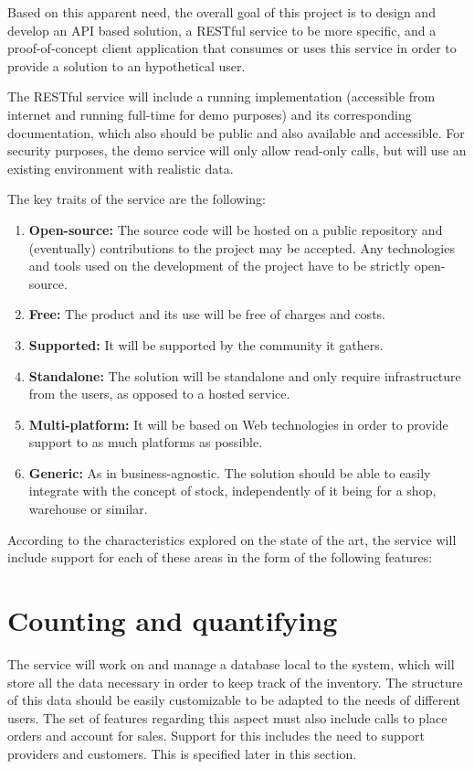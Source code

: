 Based on this apparent need, the overall goal of this project is to design and develop an API based solution, a RESTful service to be more specific, and a proof-of-concept client application that consumes or uses this service in order to provide a solution to an hypothetical user.

The RESTful service will include a running implementation (accessible from internet and running full-time for demo purposes) and its corresponding documentation, which also should be public and also available and accessible. For security purposes, the demo service will only allow read-only calls, but will use an existing environment with realistic data. 

The key traits of the service are the following:

\begin{enumerate}
\item \textbf{Open-source:}
The source code will be hosted on a public repository and (eventually) contributions to the project may be accepted. Any technologies and tools used  on the development of the project have to be strictly open-source.

\item \textbf{Free:}
The product and its use will be free of charges and costs.

\item \textbf{Supported:}
It will be supported by the community it gathers.

\item \textbf{Standalone:}
The solution will be standalone and only require infrastructure from the users, as opposed to a hosted service.

\item \textbf{Multi-platform:}
It will be based on Web technologies in order to provide support to as much platforms as possible.

\item \textbf{Generic:}
As in business-agnostic. The solution should be able to easily integrate with the concept of stock, independently of it being for a shop, warehouse or similar.
\end{enumerate}

According to the characteristics explored on the state of the art, the service will include support for each of these areas in the form of the following features:
\section{Counting and quantifying}
The service will work on and manage a database local to the system, which will store all the data necessary in order to keep track of the inventory. The structure of this data should be easily customizable to be adapted to the needs of different users. The set of features regarding this aspect must also include calls to place orders and account for sales. Support for this includes the need to support providers and customers. This is specified later in this section.
